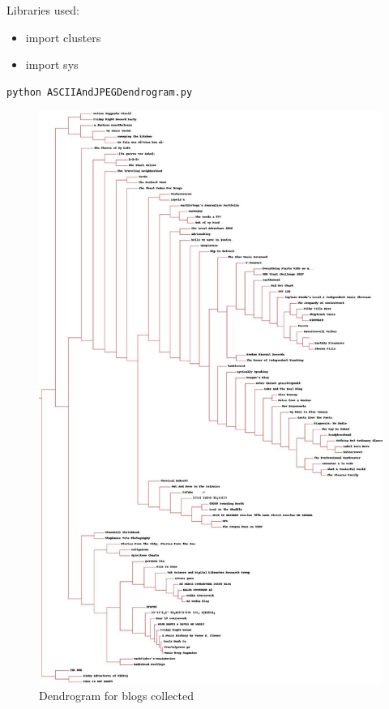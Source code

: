 \documentclass[letterpaper,11pt]{article}
\begin{document}
Libraries used:

\begin{itemize}
\item import clusters
\item import sys
\end{itemize}
\begin{lstlisting}[frame=single]
python ASCIIAndJPEGDendrogram.py
\end{lstlisting}

 


 \begin{figure}[h]
 \centering
 \includegraphics[scale=0.26]{Dendrogram}
 \caption{Dendrogram for blogs collected}
 \label{fig:dendro}
 \end{figure}
\end{document}

